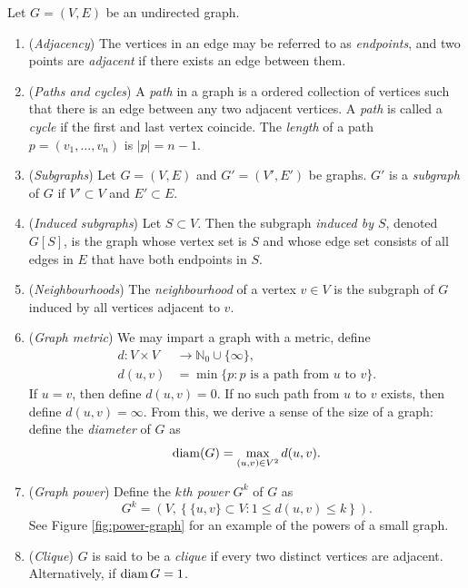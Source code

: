\begin{definition}
    Let $G = (V,E)$ be an undirected graph.
    \begin{enumerate}
        \item (\emph{Adjacency}) The vertices in an edge may be referred to as \emph{endpoints}, and two points are \emph{adjacent} if there exists an edge between them.
        \item (\emph{Paths and cycles}) A \emph{path} in a graph is a ordered collection of vertices such that there is an edge between any two adjacent vertices. A \emph{path} is called a \emph{cycle} if the first and last vertex coincide. The \emph{length} of a path $p = (v_1, \ldots, v_n)$ is $\lvert p \rvert = n-1$.
        \item (\emph{Subgraphs}) Let $G = (V,E)$ and $G' = (V', E')$ be graphs. $G'$ is a \emph{subgraph} of $G$ if $V' \subset V$ and $E' \subset E$.
        \item (\emph{Induced subgraphs}) Let $S \subset V$. Then the subgraph \emph{induced by $S$}, denoted $G[S]$, is the graph whose vertex set is $S$ and whose edge set consists of all edges in $E$ that have both endpoints in $S$.
        \item (\emph{Neighbourhoods}) The \emph{neighbourhood} of a vertex $v \in V$ is the subgraph of $G$ induced by all vertices adjacent to $v$. 
        \item (\emph{Graph metric}) We may impart a graph with a metric, define
        \begin{align*}
            d: V \times V & \to \mathbb N_0 \cup \{\infty\},                             \\
            d(u,v)        & = \min\{p: \text{$p$ is a path from $u$ to $v$}\}.
        \end{align*}
        If $u = v$, then define $d(u,v) = 0$. If no such path from $u$ to $v$ exists, then define $d(u,v) = \infty$. From this, we derive a sense of the size of a graph: define the \emph{diameter} of $G$ as
        \[ \operatorname{diam}(G) = \max_{(u,v) \in V^2} d(u,v). \]
        \item (\emph{Graph power}) Define the \emph{$k$th power} $G^k$ of $G$ as
        \[ G^k = \left(V, \left\{\{u, v\} \subset V: 1 \leq d(u,v) \leq k \right\}\right). \]
        See Figure \ref{fig:power-graph} for an example of the powers of a small graph. 
        \item (\emph{Clique}) $G$ is said to be a \emph{clique} if every two distinct vertices are adjacent. Alternatively, if $\operatorname{diam} G = 1$. 
    \end{enumerate}
\end{definition}

